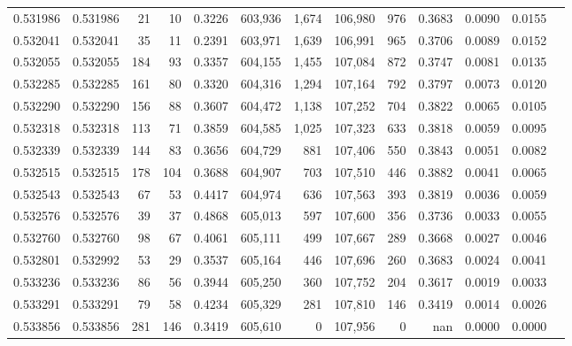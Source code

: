 \begin{tabular}{rrrrrrrrrrrrr}
0.531986 & 0.531986 &    21 &    10 &                                     0.3226 & 603,936 &   1,674 & 106,980 &     976 & 0.3683 & 0.0090 & 0.0155 \\
0.532041 & 0.532041 &    35 &    11 &                                     0.2391 & 603,971 &   1,639 & 106,991 &     965 & 0.3706 & 0.0089 & 0.0152 \\
0.532055 & 0.532055 &   184 &    93 &                                     0.3357 & 604,155 &   1,455 & 107,084 &     872 & 0.3747 & 0.0081 & 0.0135 \\
0.532285 & 0.532285 &   161 &    80 &                                     0.3320 & 604,316 &   1,294 & 107,164 &     792 & 0.3797 & 0.0073 & 0.0120 \\
0.532290 & 0.532290 &   156 &    88 &                                     0.3607 & 604,472 &   1,138 & 107,252 &     704 & 0.3822 & 0.0065 & 0.0105 \\
0.532318 & 0.532318 &   113 &    71 &                                     0.3859 & 604,585 &   1,025 & 107,323 &     633 & 0.3818 & 0.0059 & 0.0095 \\
0.532339 & 0.532339 &   144 &    83 &                                     0.3656 & 604,729 &     881 & 107,406 &     550 & 0.3843 & 0.0051 & 0.0082 \\
0.532515 & 0.532515 &   178 &   104 &                                     0.3688 & 604,907 &     703 & 107,510 &     446 & 0.3882 & 0.0041 & 0.0065 \\
0.532543 & 0.532543 &    67 &    53 &                                     0.4417 & 604,974 &     636 & 107,563 &     393 & 0.3819 & 0.0036 & 0.0059 \\
0.532576 & 0.532576 &    39 &    37 &                                     0.4868 & 605,013 &     597 & 107,600 &     356 & 0.3736 & 0.0033 & 0.0055 \\
0.532760 & 0.532760 &    98 &    67 &                                     0.4061 & 605,111 &     499 & 107,667 &     289 & 0.3668 & 0.0027 & 0.0046 \\
0.532801 & 0.532992 &    53 &    29 &                                     0.3537 & 605,164 &     446 & 107,696 &     260 & 0.3683 & 0.0024 & 0.0041 \\
0.533236 & 0.533236 &    86 &    56 &                                     0.3944 & 605,250 &     360 & 107,752 &     204 & 0.3617 & 0.0019 & 0.0033 \\
0.533291 & 0.533291 &    79 &    58 &                                     0.4234 & 605,329 &     281 & 107,810 &     146 & 0.3419 & 0.0014 & 0.0026 \\
0.533856 & 0.533856 &   281 &   146 &                                     0.3419 & 605,610 &       0 & 107,956 &       0 &    nan & 0.0000 & 0.0000 \\
\bottomrule
\end{tabular}
